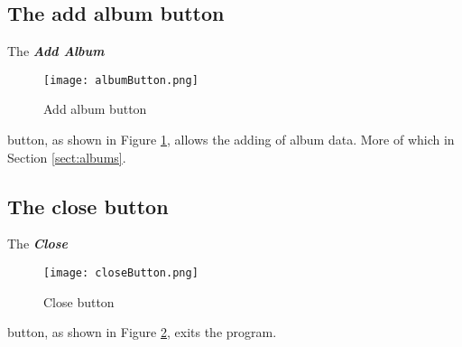 \subsection{The add album button}
The 
\textbf{\textit{Add Album}}
\begin{figure}[!h]
  \texttt{[image: albumButton.png]}
  \caption{Add album button}
  \label{fig:Add album button}
\end{figure}
button, as shown in Figure 
\ref{fig:Add album button},
allows the adding of album data.  More of which in Section 
\ref{sect:albums}.

\subsection{The close button}
The 
\textbf{\textit{Close}}
\begin{figure}[!h]
  \texttt{[image: closeButton.png]}
  \caption{Close button}
  \label{fig:Close button}
\end{figure}button, as shown in Figure 
\ref{fig:Close button},
exits the program.
